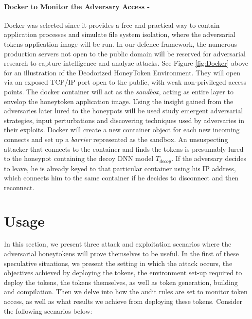 \documentclass[grad,lot,lof,11pt,oneside,onehalfspace]{RUthesis}
\begin{document}
\paragraph{Docker to Monitor the Adversary Access -} Docker was selected since it provides a free and practical way to contain application processes and simulate file system isolation, where the adversarial tokens application image will be run. In our defence framework, the numerous production servers not open to the public domain will be reserved for adversarial research to capture intelligence and analyze attacks. See Figure \ref{fig:Docker} above for an illustration of the Deodorized HoneyToken Environment. They will open via an exposed TCP/IP port open to the public, with weak non-privileged access points. The docker container will act as the \textit{sandbox},  acting as entire layer to envelop the honeytoken application image. Using the insight gained from the adversaries later lured to the honeypots will be used study emergent adversarial strategies, input perturbations and discovering techniques used by adversaries in their exploits. Docker will create a new container object for each new incoming connects and set up a \textit{barrier} represented as the sandbox. An unsuspecting attacker that connects to the container and finds the tokens is presumably lured to the honeypot containing the decoy DNN model \textit{$T_{decoy}$}. If the adversary decides to leave, he is already keyed to that particular container using his IP address, which connects him to the same container if he decides to disconnect and then reconnect.
\section{Usage}
In this section, we present three attack and exploitation scenarios where the adversarial honeytokens will prove themselves to be useful. In the first of these speculative situations, we present the setting in which the attack occurs, the objectives achieved by deploying the tokens, the environment set-up required to deploy the tokens, the tokens themselves, as well as token generation, building and compilation. Then we delve into how the audit rules are set to monitor token access, as well as what results we achieve from deploying these tokens. Consider the following scenarios below:
\end{document}
